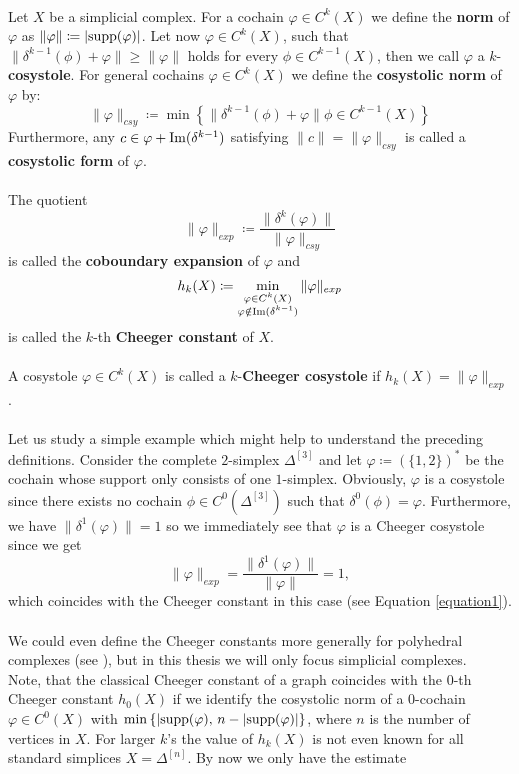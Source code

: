 \\
Let \(X\) be a simplicial complex. For a cochain \(\varphi\in C^k(X)\) we define the \textbf{norm} of \(\varphi\) as \(\|\varphi\|\coloneqq |\mathrm{supp}(\varphi)|\). Let now \(\varphi\in C^k(X)\), such that \(\|\delta^{k-1}(\phi)+\varphi\|\geq\|\varphi\|\) holds for every \(\phi\in C^{k-1}(X)\), then we call \(\varphi\) a \(k\)-\textbf{cosystole}. For general cochains \(\varphi\in C^k(X)\) we define the \textbf{cosystolic norm} of \(\varphi\) by:
\[
\|\varphi\|_{csy}\coloneqq \min\left\{\|\delta^{k-1}(\phi)+\varphi\|\phi\in C^{k-1}(X)\right\}
\]
Furthermore, any \(c\in \varphi+\mathrm{Im}(\delta^{k-1})\) satisfying \(\|c\|=\|\varphi\|_{csy}\) is called a \textbf{cosystolic form} of \(\varphi\).\\
\\
The quotient
\[
\|\varphi\|_{exp}\coloneqq \frac{\|\delta^k(\varphi)\|}{\|\varphi\|_{csy}}
\]
is called the \textbf{coboundary expansion} of \(\varphi\) and
\[
h_k(X)\coloneqq \min_{\substack{\varphi\in C^k(X)\\\varphi\notin\mathrm{Im}(\delta^{k-1})}}\|\varphi\|_{exp}
\]
is called the \(k\)-th \textbf{Cheeger constant} of \(X\).\\
\\
A cosystole \(\varphi\in C^k(X)\) is called a \(k\)-\textbf{Cheeger cosystole} if \(h_k(X)=\|\varphi\|_{exp}\).\\
\\
Let us study a simple example which might help to understand the preceding definitions. Consider the complete \(2\)-simplex \(\Delta^{[3]}\) and let \(\varphi\coloneqq (\{1,2\})^*\) be the cochain whose support only consists of one \(1\)-simplex. Obviously, \(\varphi\) is a cosystole since there exists no cochain \(\phi\in C^0(\Delta^{[3]})\) such that \(\delta^0(\phi)=\varphi\). Furthermore, we have \(\|\delta^1(\varphi)\|=1\) so we immediately see that \(\varphi\) is a Cheeger cosystole since we get
\[
\|\varphi\|_{exp}=\frac{\|\delta^1(\varphi)\|}{\|\varphi\|}=1,
\]
which coincides with the Cheeger constant in this case (see Equation \ref{equation1}).\\
\\
We could even define the Cheeger constants more generally for polyhedral complexes (see \cite{6}), but in this thesis we will only focus simplicial complexes.\\
Note, that the classical Cheeger constant of a graph coincides with the \(0\)-th Cheeger constant \(h_0(X)\) if we identify the cosystolic norm of a \(0\)-cochain \(\varphi\in C^0(X)\) with \(\min\left\{|\mathrm{supp}(\varphi)\text{, }n-|\mathrm{supp}(\varphi)|\right\}\), where \(n\) is the number of vertices in \(X\). For larger \(k\)'s the value of \(h_k(X)\) is not even known for all standard simplices \(X=\Delta^{[n]}\). By now we only have the estimate

